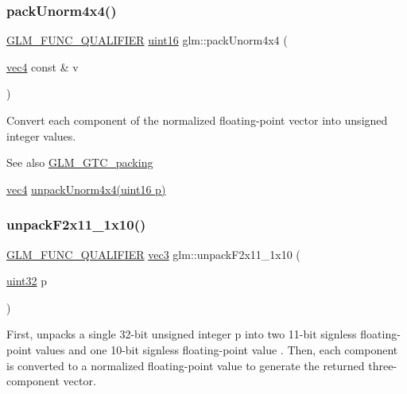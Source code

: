 \subsubsection{\texorpdfstring{pack\+Unorm4x4()}{packUnorm4x4()}}
{\footnotesize\ttfamily \hyperlink{setup_8hpp_a33fdea6f91c5f834105f7415e2a64407}{G\+L\+M\+\_\+\+F\+U\+N\+C\+\_\+\+Q\+U\+A\+L\+I\+F\+I\+ER} \hyperlink{group__gtc__type__precision_gad8c2939e1fdd8e5828b31d95c52255d5}{uint16} glm\+::pack\+Unorm4x4 (\begin{DoxyParamCaption}\item[{\hyperlink{group__core__types_ga5881b1b022d7fd1b7218f5916532dd02}{vec4} const \&}]{v }\end{DoxyParamCaption})}

Convert each component of the normalized floating-\/point vector into unsigned integer values.

\begin{DoxySeeAlso}{See also}
\hyperlink{group__gtc__packing}{G\+L\+M\+\_\+\+G\+T\+C\+\_\+packing} 

\hyperlink{group__core__types_ga5881b1b022d7fd1b7218f5916532dd02}{vec4} \hyperlink{group__gtc__packing_ga38a0a518d53e15a9481c31dc1e574a40}{unpack\+Unorm4x4(uint16 p)} 
\end{DoxySeeAlso}
\mbox{\label{group__gtc__packing_ga8b9c7991eb021d95c778bf5c0b2f7824}} 
\subsubsection{\texorpdfstring{unpack\+F2x11\+\_\+1x10()}{unpackF2x11\_1x10()}}
{\footnotesize\ttfamily \hyperlink{setup_8hpp_a33fdea6f91c5f834105f7415e2a64407}{G\+L\+M\+\_\+\+F\+U\+N\+C\+\_\+\+Q\+U\+A\+L\+I\+F\+I\+ER} \hyperlink{group__core__types_ga1c47e8b3386109bc992b6c48e91b0be7}{vec3} glm\+::unpack\+F2x11\+\_\+1x10 (\begin{DoxyParamCaption}\item[{\hyperlink{group__gtc__type__precision_ga202b6a53c105fcb7e531f9b443518451}{uint32}}]{p }\end{DoxyParamCaption})}

First, unpacks a single 32-\/bit unsigned integer p into two 11-\/bit signless floating-\/point values and one 10-\/bit signless floating-\/point value . Then, each component is converted to a normalized floating-\/point value to generate the returned three-\/component vector.

